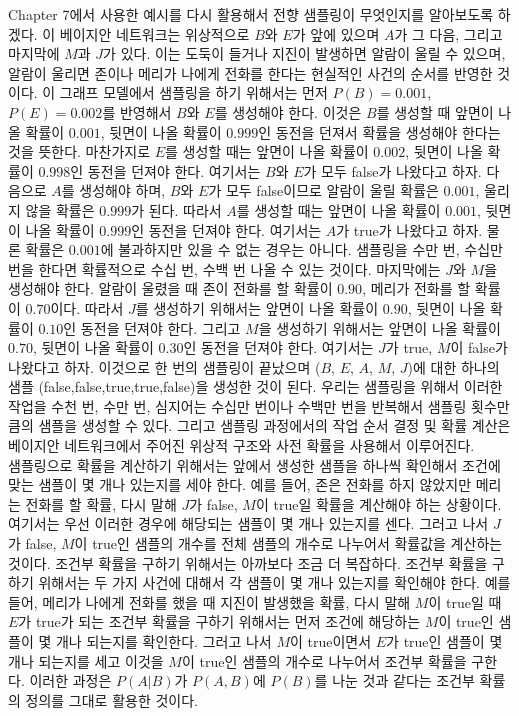 \documentclass[a4paper]{oblivoir}
\begin{document}
Chapter 7에서 사용한 예시를 다시 활용해서 전향 샘플링이 무엇인지를 알아보도록 하겠다. 이 베이지안 네트워크는 위상적으로 $B$와 $E$가 앞에 있으며 $A$가 그 다음, 그리고 마지막에 $M$과 $J$가 있다. 이는 도둑이 들거나 지진이 발생하면 알람이 울릴 수 있으며, 알람이 울리면 존이나 메리가 나에게 전화를 한다는 현실적인 사건의 순서를 반영한 것이다. 이 그래프 모델에서 샘플링을 하기 위해서는 먼저 $P(B)=0.001$, $P(E)=0.002$를 반영해서 $B$와 $E$를 생성해야 한다. 이것은 $B$를 생성할 때 앞면이 나올 확률이 $0.001$, 뒷면이 나올 확률이 $0.999$인 동전을 던져서 확률을 생성해야 한다는 것을 뜻한다. 마찬가지로 $E$를 생성할 때는 앞면이 나올 확률이 $0.002$, 뒷면이 나올 확률이 $0.998$인 동전을 던져야 한다. 여기서는 $B$와 $E$가 모두 false가 나왔다고 하자. 다음으로 $A$를 생성해야 하며, $B$와 $E$가 모두 false이므로 알람이 울릴 확률은 $0.001$, 울리지 않을 확률은 $0.999$가 된다. 따라서 $A$를 생성할 때는 앞면이 나올 확률이 $0.001$, 뒷면이 나올 확률이 $0.999$인 동전을 던져야 한다. 여기서는 $A$가 true가 나왔다고 하자. 물론 확률은 $0.001$에 불과하지만 있을 수 없는 경우는 아니다. 샘플링을 수만 번, 수십만 번을 한다면 확률적으로 수십 번, 수백 번 나올 수 있는 것이다. 마지막에는 $J$와 $M$을 생성해야 한다. 알람이 울렸을 때 존이 전화를 할 확률이 $0.90$, 메리가 전화를 할 확률이 $0.70$이다. 따라서 $J$를 생성하기 위해서는 앞면이 나올 확률이 $0.90$, 뒷면이 나올 확률이 $0.10$인 동전을 던져야 한다. 그리고 $M$을 생성하기 위해서는 앞면이 나올 확률이 $0.70$, 뒷면이 나올 확률이 $0.30$인 동전을 던져야 한다. 여기서는 $J$가 true, $M$이 false가 나왔다고 하자. 이것으로 한 번의 샘플링이 끝났으며 ($B$, $E$, $A$, $M$, $J$)에 대한 하나의 샘플 (false,false,true,true,false)을 생성한 것이 된다. 우리는 샘플링을 위해서 이러한 작업을 수천 번, 수만 번, 심지어는 수십만 번이나 수백만 번을 반복해서 샘플링 횟수만큼의 샘플을 생성할 수 있다. 그리고 샘플링 과정에서의 작업 순서 결정 및 확률 계산은 베이지안 네트워크에서 주어진 위상적 구조와 사전 확률을 사용해서 이루어진다. \\

샘플링으로 확률을 계산하기 위해서는 앞에서 생성한 샘플을 하나씩 확인해서 조건에 맞는 샘플이 몇 개나 있는지를 세야 한다. 예를 들어, 존은 전화를 하지 않았지만 메리는 전화를 할 확률, 다시 말해 $J$가 false, $M$이 true일 확률을 계산해야 하는 상황이다. 여기서는 우선 이러한 경우에 해당되는 샘플이 몇 개나 있는지를 센다. 그러고 나서 $J$가 false, $M$이 true인 샘플의 개수를 전체 샘플의 개수로 나누어서 확률값을 계산하는 것이다. 조건부 확률을 구하기 위해서는 아까보다 조금 더 복잡하다. 조건부 확률을 구하기 위해서는 두 가지 사건에 대해서 각 샘플이 몇 개나 있는지를 확인해야 한다. 예를 들어, 메리가 나에게 전화를 했을 때 지진이 발생했을 확률, 다시 말해 $M$이 true일 때 $E$가 true가 되는 조건부 확률을 구하기 위해서는 먼저 조건에 해당하는 $M$이 true인 샘플이 몇 개나 되는지를 확인한다. 그러고 나서 $M$이 true이면서 $E$가 true인 샘플이 몇 개나 되는지를 세고 이것을 $M$이 true인 샘플의 개수로 나누어서 조건부 확률을 구한다. 이러한 과정은 $P(A|B)$가 $P(A,B)$에 $P(B)$를 나눈 것과 같다는 조건부 확률의 정의를 그대로 활용한 것이다. \\    
\end{document}
